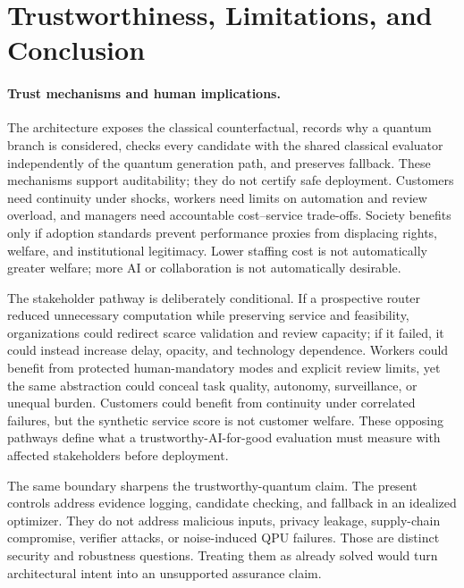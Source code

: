 \section{Trustworthiness, Limitations, and Conclusion}
\label{sec:trustworthiness}
\label{sec:limitations}

\paragraph{Trust mechanisms and human implications.}
The architecture exposes the classical counterfactual, records why a quantum branch is considered, checks every candidate with the shared classical evaluator independently of the quantum generation path, and preserves fallback. These mechanisms support auditability; they do not certify safe deployment. Customers need continuity under shocks, workers need limits on automation and review overload, and managers need accountable cost--service trade-offs. Society benefits only if adoption standards prevent performance proxies from displacing rights, welfare, and institutional legitimacy. Lower staffing cost is not automatically greater welfare; more AI or collaboration is not automatically desirable.

The stakeholder pathway is deliberately conditional. If a prospective router reduced unnecessary computation while preserving service and feasibility, organizations could redirect scarce validation and review capacity; if it failed, it could instead increase delay, opacity, and technology dependence. Workers could benefit from protected human-mandatory modes and explicit review limits, yet the same abstraction could conceal task quality, autonomy, surveillance, or unequal burden. Customers could benefit from continuity under correlated failures, but the synthetic service score is not customer welfare. These opposing pathways define what a trustworthy-AI-for-good evaluation must measure with affected stakeholders before deployment.

The same boundary sharpens the trustworthy-quantum claim. The present controls address evidence logging, candidate checking, and fallback in an idealized optimizer. They do not address malicious inputs, privacy leakage, supply-chain compromise, verifier attacks, or noise-induced QPU failures. Those are distinct security and robustness questions. Treating them as already solved would turn architectural intent into an unsupported assurance claim.

